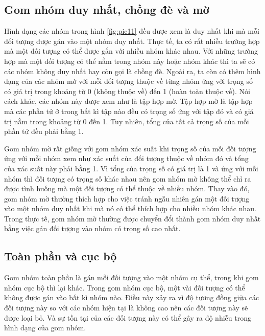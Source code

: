 \subsection{Gom nhóm duy nhất, chồng đè và mờ}
Hình dạng các nhóm trong hình \ref{fig:pic11} đều được xem là duy nhất khi mà mỗi đối tượng được gán vào một nhóm duy nhất.
Thực tế, ta có rất nhiều trường hợp mà một đối tượng có thể được gắn với nhiều nhóm khác nhau.
Với những trường hợp mà một đối tượng có thể nằm trong nhóm này hoặc nhóm khác thì ta sẽ có các nhóm không duy nhất hay còn gọi là chồng đè.
Ngoài ra, ta còn có thêm hình dạng của các nhóm mờ với mỗi đối tượng thuộc về từng nhóm ứng với trọng số có giá trị trong khoảng từ 0 (không thuộc về) đến 1 (hoàn toàn thuộc về).
Nói cách khác, các nhóm này được xem như là tập hợp mờ.
Tập hợp mờ là tập hợp mà các phần tử ở trong bất kì tập nào đều có trọng số ứng với tập đó và có giá trị nằm trong khoảng từ 0 đến 1.
Tuy nhiên, tổng của tất cả trọng số của mỗi phần tử đều phải bằng 1.

Gom nhóm mờ rất giống với gom nhóm xác suất khi trọng số của mỗi đối tượng ứng với mỗi nhóm xem như xác suất của đối tượng thuộc về nhóm đó và tổng của xác suất này phải bằng 1.
Vì tổng của trọng số có giá trị là 1 và ứng với mỗi nhóm thì đối tượng có trọng số khác nhau nên gom nhóm mờ không thể chỉ ra được tình huống mà một đối tượng có thể thuộc về nhiều nhóm.
Thay vào đó, gom nhóm mờ thường thích hợp cho việc tránh ngẫu nhiên gán một đối tượng vào một nhóm duy nhất khi mà nó có thể thích hợp cho nhiều nhóm khác nhau.
Trong thực tế, gom nhóm mờ thường được chuyển đổi thành gom nhóm duy nhất bằng việc gán đối tượng vào nhóm có trọng số cao nhất.

\subsection{Toàn phần và cục bộ}
Gom nhóm toàn phần là gán mỗi đối tượng vào một nhóm cụ thể, trong khi gom nhóm cục bộ thì lại khác.
Trong gom nhóm cục bộ, một vài đối tượng có thể không được gán vào bất kì nhóm nào.
Điều này xảy ra vì độ tương đồng giữa các đối tượng này so với các nhóm hiện tại là không cao nên các đối tượng này sẽ được loại bỏ.
Và sự tồn tại của các đối tượng này có thể gây ra độ nhiễu trong hình dạng của gom nhóm.

